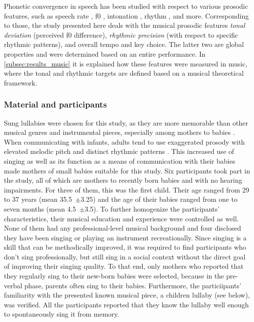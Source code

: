 Phonetic convergence in speech has been studied with respect to various prosodic features, such as speech rate \citep{Schweitzer2013convergence, Pardo2012phonetic}, \acl{f0} \citep{Babel2012role, Collins1998convergence}, intonation \citep{DImperio2014phonetic, Simonet2011intonational}, rhythm \citep{Krivokapic2013rhythm}, and more.
Corresponding to those, the study presented here deals with the musical prosodic features \emph{tonal deviation} (perceived \acf{f0} difference), \emph{rhythmic precision} (with respect to specific rhythmic patterns), and overall tempo and key choice.
The latter two are global properties and were determined based on an entire performance.
In \cref{subsec:results_music} it is explained how these features were measured in music, where the tonal and rhythmic targets are defined based on a musical theoretical framework.

\subsubsection{Material and participants}
\label{subsubsec:material_participants_music}

Sung lullabies were chosen for this study, as they are more memorable than other musical genres and instrumental pieces, especially among mothers to babies \citep{Weiss2012something, Trehub1991music}.
When communicating with infants, adults tend to use exaggerated prosody with elevated melodic pitch and distinct rhythmic patterns \citep{Fernald1991prosody}.
This increased use of singing as well as its function as a means of communication with their babies \citep[see][]{Street2003mothers,Papouvsek1991meanings} made mothers of small babies suitable for this study.
Six participants took part in the study, all of which are mothers to recently born babies and with no hearing impairments.
For three of them, this was the first child.
Their age ranged from 29 to 37 years (mean 35.5~$\pm$3.25) and the age of their babies ranged from one to seven months (mean 4.5~$\pm$3.5).
To further homogenize the participants' characteristics, their musical education and experience were controlled as well.
None of them had any professional-level musical background and four disclosed they have been singing or playing an instrument recreationally.
Since singing is a skill that can be methodically improved, it was required to find participants who don't sing professionally, but still sing in a social context without the direct goal of improving their singing quality.
To that end, only mothers who reported that they regularly sing to their new-born babies were selected, because in the pre-verbal phase, parents often sing to their babies.
Furthermore, the particiipants' familiarity with the presented known musical piece, a children lullaby (see below), was verified.
All the participants reported that they know the lullaby well enough to spontaneously sing it from memory.

